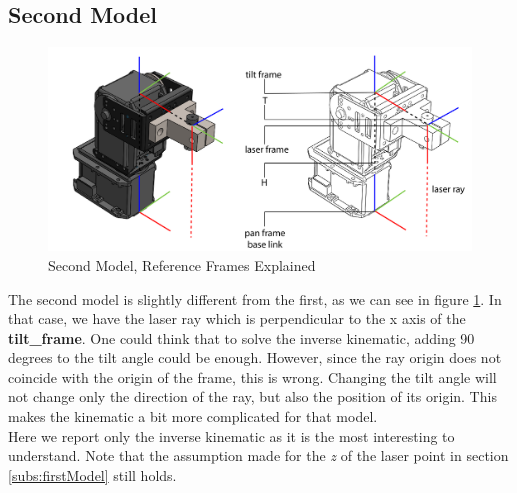 \subsection{Second Model} \label{subs:secondModel}
\begin{figure}
	\centering
	\includegraphics[width=\textwidth]{img/model2Refbis.png}%
	\caption{Second Model, Reference Frames Explained}
	\label{fig:secondModelRefFrame}
\end{figure}
The second model is slightly different from the first, as we can see in figure \ref{fig:secondModelRefFrame}. In that case, we have the laser ray which is perpendicular to the x axis of the \textbf{tilt\_frame}. One could think that to solve the inverse kinematic, adding 90 degrees to the tilt angle could be enough. However, since the ray origin does not coincide with the origin of the frame, this is wrong. Changing the tilt angle will not change only the direction of the ray, but also the position of its origin. This makes the kinematic a bit more complicated for that model.
\\
Here we report only the inverse kinematic as it is the most interesting to understand. Note that the assumption made for the \textit{z} of the laser point in section \ref{subs:firstModel} still holds.
